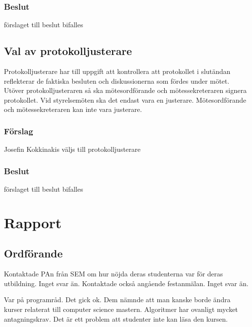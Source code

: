\documentclass[protokoll]{dvd}
\begin{document}
\subsubsection*{Beslut}
\begin{attsatser}
    \item förslaget till beslut bifalles
\end{attsatser}

\subsection{Val av protokolljusterare}

Protokolljusterare har till uppgift att kontrollera att protokollet i slutändan reflekterar de faktiska besluten och diskussionerna som fördes under mötet.
Utöver protokolljusteraren så ska mötesordförande och mötessekreteraren signera protokollet.
Vid styrelsemöten ska det endast vara en justerare.
Mötesordförande och mötessekreteraren kan inte vara justerare.

\subsubsection*{Förslag}
\begin{attsatser}
    \item Josefin Kokkinakis väljs till protokolljusterare
\end{attsatser}
\subsubsection*{Beslut}
\begin{attsatser}
    \item förslaget till beslut bifalles
\end{attsatser}

\section{Rapport}
\subsection{Ordförande}
Kontaktade PAn från SEM om hur nöjda deras studenterna var för deras utbildning. Inget svar än.
Kontaktade också angående festanmälan. Inget svar än.

Var på programråd. Det gick ok. Dem nämnde att man kanske borde ändra kurser relaterat till computer science mastern. Algoritmer har ovanligt mycket antagningskrav. Det är ett problem att studenter inte kan läsa den kursen.
\end{document}
